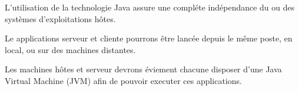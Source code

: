 \documentclass[10pt,a4paper]{article}
\begin{document}
L'utilisation de la technologie Java assure une compléte indépendance du ou des systèmes d'exploitations hôtes.

Le applications serveur et cliente pourrons être lancée depuis le même poste, en local, ou sur des machines distantes.

Les machines hôtes et serveur devrons éviement chacune disposer d'une Java Virtual Machine (JVM) afin de pouvoir executer ces applications.
\end{document}

